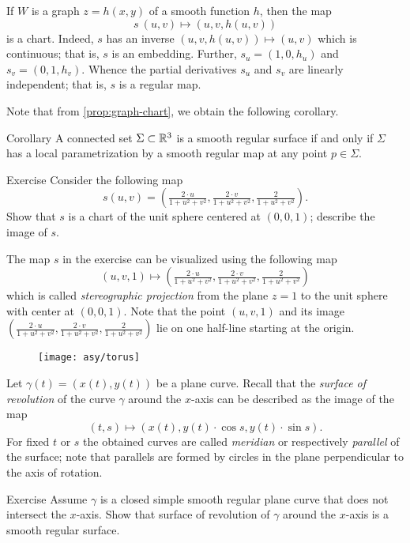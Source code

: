 If $W$ is a graph $z=h(x,y)$ of a smooth function $h$, then the map 
\[s\:(u,v)\mapsto (u,v,h(u,v))\] is a chart.
Indeed, $s$ has an inverse $(u,v,h(u,v))\mapsto (u,v)$ which is continuous;
that is, $s$ is an embedding.
Further,
$s_u=(1,0,h_u)$ and $s_v=(0,1,h_v)$. 
Whence the partial derivatives $s_u$ and $s_v$ are linearly independent;
that is, $s$ is a regular map.

Note that from \ref{prop:graph-chart}, we obtain the following corollary.

\begin{thm}{Corollary}\label{cor:reg-parmeterization}
A connected set $\Sigma\subset \mathbb{R}^3$ is a smooth regular surface if and only if $\Sigma$ has a local parametrization by a smooth regular map at any point $p\in\Sigma$.
\end{thm}


\begin{thm}{Exercise}\label{ex:inversion-chart}
Consider the following map 
\[s(u,v)=(\tfrac{2\cdot u}{1+u^2+v^2},\tfrac{2\cdot v}{1+u^2+v^2},\tfrac{2}{1+u^2+v^2}).\]
Show that $s$ is a chart of the unit sphere centered at $(0,0,1)$; describe the image of $s$.
\end{thm}

The map $s$ in the exercise can be visualized using the following map
\[(u,v,1)\mapsto (\tfrac{2\cdot u}{1+u^2+v^2},\tfrac{2\cdot v}{1+u^2+v^2},\tfrac{2}{1+u^2+v^2})\]
which is called \emph{stereographic projection} from the plane $z=1$ to the unit sphere with center at $(0,0,1)$.
Note that the point $(u,v,1)$ and its image $(\tfrac{2\cdot u}{1+u^2+v^2},\tfrac{2\cdot v}{1+u^2+v^2},\tfrac{2}{1+u^2+v^2})$ lie on one half-line starting at the origin. %

\begin{wrapfigure}{o}{31 mm}
\vskip-0mm
\centering
\texttt{[image: asy/torus]}
\vskip-0mm
\end{wrapfigure}

Let $\gamma(t)=(x(t),y(t))$ be a plane curve.
Recall that the \emph{surface of revolution} of the curve $\gamma$ around the $x$-axis can be described as the 
image of the map 
\[(t, s)\mapsto (x(t), y(t)\cdot\cos s,y(t)\cdot\sin s).\]
For fixed $t$ or $ s$ the obtained curves are called \emph{meridian} or respectively \emph{parallel} of the surface; note that parallels are formed by circles in the plane perpendicular to the axis of rotation.

\begin{thm}{Exercise}\label{ex:revolution}
Assume $\gamma$ is a closed simple smooth regular plane curve that does not intersect the $x$-axis.
Show that surface of revolution of $\gamma$ around the $x$-axis is a smooth regular surface.
\end{thm}



